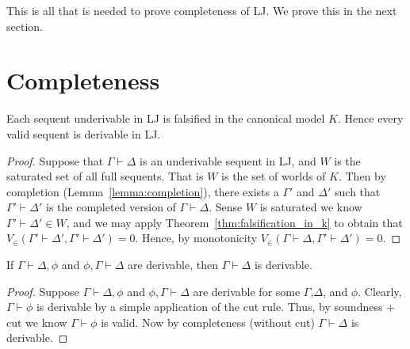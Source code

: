 \documentclass{article}
\begin{document}
\noindent
This is all that is needed to prove completeness of LJ.  We prove this in the next section.

\section{Completeness}
\label{sec:completeness}

\begin{thm}[Completeness]
  \label{thm:completeness}
  Each sequent underivable in LJ is falsified in the canonical model $K$.  Hence
  every valid sequent is derivable in LJ.
\end{thm}
\begin{proof}
  Suppose that $\Gamma \vdash \Delta$ is an underivable sequent in LJ, and $W$ is the saturated set of all full sequents.
  That is $W$ is the set of worlds of $K$. Then by completion (Lemma~\ref{lemma:completion}),
  there exists a $\Gamma'$ and $\Delta'$ such that $\Gamma' \vdash \Delta'$ is the completed version of $\Gamma \vdash \Delta$. 
  Sense $W$ is saturated we know $\Gamma' \vdash \Delta' \in W$, and we may apply Theorem~\ref{thm:falsification_in_k} to obtain
  that $V_\in(\Gamma' \vdash \Delta', \Gamma' \vdash \Delta') = 0$.  Hence, by monotonicity 
  $V_\in(\Gamma \vdash \Delta, \Gamma' \vdash \Delta') = 0$.
\end{proof}

\begin{corollary}
  \label{corollary:admissibility_of_cut}
  If $\Gamma \vdash \Delta, \phi$ and $\phi, \Gamma \vdash \Delta$ are derivable, then $\Gamma \vdash \Delta$ is derivable.
\end{corollary}
\begin{proof}
  Suppose $\Gamma \vdash \Delta, \phi$ and $\phi, \Gamma \vdash \Delta$ are derivable for some $\Gamma$,$\Delta$, and $\phi$.
  Clearly, $\Gamma \vdash \phi$ is derivable by a simple application of the cut rule.  Thus, by soundness + cut we know 
  $\Gamma \vdash \phi$ is valid.  Now by completeness (without cut) $\Gamma \vdash \Delta$ is derivable. 
\end{proof}
\end{document}
